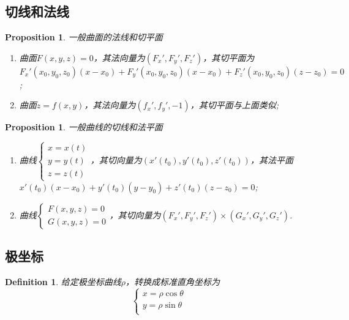 \documentclass{article}
\newtheorem{proposition}[theorem]{Proposition}
\newtheorem{definition}[theorem]{Definition}
\begin{document}
\subsection{切线和法线}

\begin{proposition}
\rm 一般曲面的法线和切平面
\begin{enumerate}
	\item 曲面$F(x,y,z) = 0$，其法向量为$(F_x',F_y',F_z')$，其切平面为$F_x'(x_0,y_0,z_0)(x-x_0) + F_y'(x_0,y_0,z_0)(x-x_0) + F_z'(x_0,y_0,z_0)(z-z_0)= 0$;
	\item 曲面$z=f(x,y)$，其法向量为$(f_x',f_y',-1)$，其切平面与上面类似;
\end{enumerate}
\end{proposition}

\begin{proposition}
\rm 一般曲线的切线和法平面
\begin{enumerate}
	\item 曲线$\left\{ \begin{array}{ll} x=x(t) \\ y=y(t) \\ z=z(t) \end{array}	 \right.$，其切向量为$(x'(t_0),y'(t_0),z'(t_0))$，其法平面$x'(t_0)(x-x_0)+y'(t_0)(y-y_0) + z'(t_0)(z-z_0) = 0$; 
	\item 曲线$\left\{ \begin{array}{ll} F(x,y,z) = 0 \\ G(x,y,z) = 0 \end{array} \right.$，其切向量为$(F_x',F_y',F_z') \times (G_x',G_y',G_z')$. 
\end{enumerate}
\end{proposition}

\subsection{极坐标}

\begin{definition}
\rm 给定极坐标曲线$\rho$，转换成标准直角坐标为
$$
\left\{
\begin{array}{ll}
x = \rho \cos \theta \\
y = \rho \sin \theta \\
\end{array} \right.
$$
\end{definition}



\end{document}
